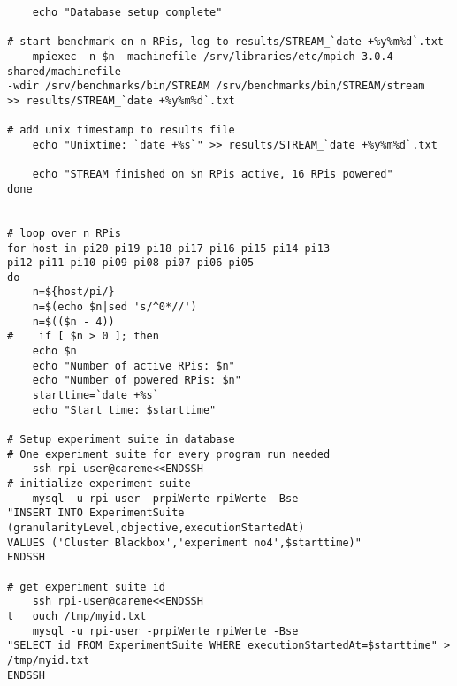 \begin{verbatim}
	echo "Database setup complete"

# start benchmark on n RPis, log to results/STREAM_`date +%y%m%d`.txt                                                                                                      
	mpiexec -n $n -machinefile /srv/libraries/etc/mpich-3.0.4-shared/machinefile 
-wdir /srv/benchmarks/bin/STREAM /srv/benchmarks/bin/STREAM/stream 
>> results/STREAM_`date +%y%m%d`.txt

# add unix timestamp to results file
	echo "Unixtime: `date +%s`" >> results/STREAM_`date +%y%m%d`.txt

	echo "STREAM finished on $n RPis active, 16 RPis powered"
done


# loop over n RPis 
for host in pi20 pi19 pi18 pi17 pi16 pi15 pi14 pi13 
pi12 pi11 pi10 pi09 pi08 pi07 pi06 pi05 
do
    n=${host/pi/}
    n=$(echo $n|sed 's/^0*//')
    n=$(($n - 4))
#    if [ $n > 0 ]; then 
	echo $n
	echo "Number of active RPis: $n"
	echo "Number of powered RPis: $n"
	starttime=`date +%s`
	echo "Start time: $starttime"

# Setup experiment suite in database                                                                                                                                        
# One experiment suite for every program run needed
	ssh rpi-user@careme<<ENDSSH
# initialize experiment suite                                                                                                                                               
	mysql -u rpi-user -prpiWerte rpiWerte -Bse 
"INSERT INTO ExperimentSuite (granularityLevel,objective,executionStartedAt) 
VALUES ('Cluster Blackbox','experiment no4',$starttime)"                                                                                                                                                              
ENDSSH

# get experiment suite id                                                                                                                                                   
	ssh rpi-user@careme<<ENDSSH                                                                                                                                                                                                                                                                                                                            
t	ouch /tmp/myid.txt                                                                                                                                                                                                                                                                                                                                 
	mysql -u rpi-user -prpiWerte rpiWerte -Bse 
"SELECT id FROM ExperimentSuite WHERE executionStartedAt=$starttime" > /tmp/myid.txt                                            
ENDSSH


\end{verbatim}

